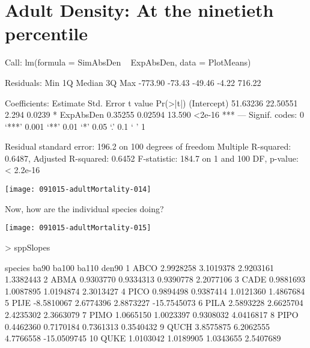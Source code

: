 \documentclass{article}
\begin{document}
\section{Adult Density: At the ninetieth percentile}
\begin{Schunk}
\begin{Soutput}
Call:
lm(formula = SimAbsDen ~ ExpAbsDen, data = PlotMeans)

Residuals:
    Min      1Q  Median      3Q     Max 
-773.90  -73.43  -49.46   -4.22  716.22 

Coefficients:
            Estimate Std. Error t value Pr(>|t|)    
(Intercept) 51.63236   22.50551   2.294   0.0239 *  
ExpAbsDen    0.35255    0.02594  13.590   <2e-16 ***
---
Signif. codes:  0 ‘***’ 0.001 ‘**’ 0.01 ‘*’ 0.05 ‘.’ 0.1 ‘ ’ 1

Residual standard error: 196.2 on 100 degrees of freedom
Multiple R-squared:  0.6487,	Adjusted R-squared:  0.6452 
F-statistic: 184.7 on 1 and 100 DF,  p-value: < 2.2e-16
\end{Soutput}
\end{Schunk}
\texttt{[image: 091015-adultMortality-014]}

Now, how are the individual species doing?

\texttt{[image: 091015-adultMortality-015]}
\begin{Schunk}
\begin{Sinput}
>   sppSlopes
\end{Sinput}
\begin{Soutput}
   species       ba90     ba100     ba110       den90
1     ABCO  2.9928258 3.1019378 2.9203161   1.3382443
2     ABMA  0.9303770 0.9334313 0.9390778   2.2077106
3     CADE  0.9881693 1.0087895 1.0194874   2.3013427
4     PICO  0.9894498 0.9387414 1.0121360   1.4867684
5     PIJE -8.5810067 2.6774396 2.8873227 -15.7545073
6     PILA  2.5893228 2.6625704 2.4235302   2.3663079
7     PIMO  1.0665150 1.0023397 0.9308032   4.0416817
8     PIPO  0.4462360 0.7170184 0.7361313   0.3540432
9     QUCH  3.8575875 6.2062555 4.7766558 -15.0509745
10    QUKE  1.0103042 1.0189905 1.0343655   2.5407689
\end{Soutput}
\end{Schunk}


\newpage
\end{document}

